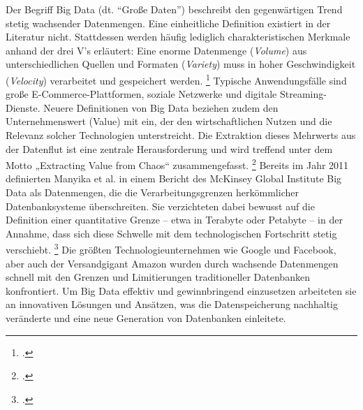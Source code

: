 Der Begriff Big Data (dt. \enquote{Große Daten}) beschreibt den gegenwärtigen Trend stetig wachsender Datenmengen. Eine einheitliche Definition existiert in der Literatur nicht. Stattdessen werden häufig lediglich charakteristischen Merkmale anhand der drei V's erläutert: Eine enorme Datenmenge (\textit{Volume}) aus unterschiedlichen Quellen und Formaten (\textit{Variety}) muss in hoher Geschwindigkeit (\textit{Velocity}) verarbeitet und gespeichert werden. \footcite[S. 5]{meierWerkzeugeDigitalenWirtschaft2018} Typische Anwendungsfälle sind große E-Commerce-Plattformen, soziale Netzwerke und digitale Streaming-Dienste. Neuere Definitionen von Big Data beziehen zudem den Unternehmenswert (Value) mit ein, der den wirtschaftlichen Nutzen und die Relevanz solcher Technologien unterstreicht. Die Extraktion dieses Mehrwerts aus der Datenflut ist eine zentrale Herausforderung und wird treffend unter dem Motto „Extracting Value from Chaos“ zusammengefasst. \footcite[S. 173 ff.]{chenBigDataSurvey2014} Bereits im Jahr 2011 definierten Manyika et al. in einem Bericht des McKinsey Global Institute Big Data als Datenmengen, die die Verarbeitungsgrenzen herkömmlicher Datenbanksysteme überschreiten. Sie verzichteten dabei bewusst auf die Definition einer quantitative Grenze – etwa in Terabyte oder Petabyte – in der Annahme, dass sich diese Schwelle mit dem technologischen Fortschritt stetig verschiebt. \footcite{manyikaBigDataNext2011} Die größten Technologieunternehmen wie Google und Facebook, aber auch der Versandgigant Amazon wurden durch wachsende Datenmengen schnell mit den Grenzen und Limitierungen traditioneller Datenbanken konfrontiert. Um Big Data effektiv und gewinnbringend einzusetzen arbeiteten sie  an innovativen Lösungen und Ansätzen, was die Datenspeicherung nachhaltig veränderte und eine neue Generation von Datenbanken einleitete.



